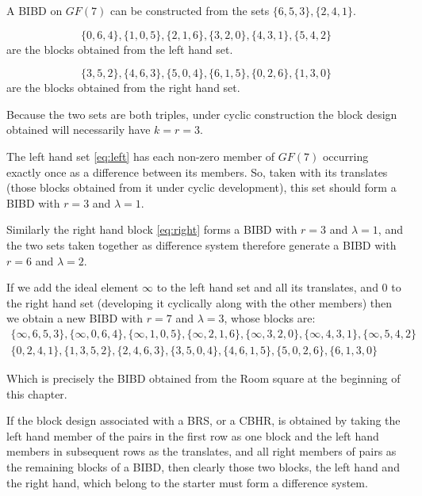 \begin{example}
A BIBD on $GF(7)$ can be constructed from the sets $\{6, 5, 3\}, \{2, 4, 1\}$.

\begin{equation}
\label{eq:left}
\{0, 6, 4\}, \{1, 0, 5\}, \{2, 1, 6\}, \{3, 2, 0\}, \{4, 3, 1\}, \{5, 4, 2\}
\end{equation}
are the blocks obtained from the left hand set.

\begin{equation}
\label{eq:right}
\{3, 5, 2\}, \{4, 6, 3\}, \{5, 0, 4\}, \{6, 1, 5\}, \{0, 2, 6\}, \{1, 3, 0\}
\end{equation}
are the blocks obtained from the right hand set.

Because the two sets are both triples, under cyclic construction the block design obtained will necessarily have $k = r = 3$.

The left hand set \eqref{eq:left} has each non-zero member of $GF(7)$ occurring exactly once as a difference between its members.
So, taken with its translates (those blocks obtained from it under cyclic development), this set should form a BIBD with $r = 3$ and $\lambda = 1$.

Similarly the right hand block \eqref{eq:right} forms a BIBD with $r = 3$ and $\lambda = 1$, and the two sets taken together as difference system therefore generate a BIBD with $r = 6$ and $\lambda = 2$.

If we add the ideal element $\infty$ to the left hand set and all its translates, and 0 to the right hand set (developing it cyclically along with the other members) then we obtain a new BIBD with $r = 7$ and $\lambda = 3$, whose blocks are:
\begin{equation*}
  \begin{split}
  \{\infty,6,5,3\},\{\infty,0,6,4\},\{\infty,1,0,5\},\{\infty,2,1,6\},\{\infty,3,2,0\},\{\infty,4,3,1\},\{\infty,5,4,2\} \\
  \{0,2,4,1\},\{1,3,5,2\},\{2,4,6,3\},\{3,5,0,4\},\{4,6,1,5\},\{5,0,2,6\},\{6,1,3,0\}
  \end{split}
\end{equation*}

Which is precisely the BIBD obtained from the Room square at the beginning of this chapter.
\end{example}

If the block design associated with a BRS, or a CBHR, is obtained by taking the left hand member of the pairs in the first row as one block and the left hand members in subsequent rows as the translates, and all right members of pairs as the remaining blocks of a BIBD, then clearly those two blocks, the left hand and the right hand, which belong to the starter must form a difference system.

